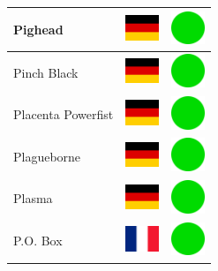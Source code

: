 \documentclass[12pt, a4paper, twoside]{report}
\begin{document}
\begin{center}
\begin{longtable}{|p{5cm}|p{2cm}|p{2cm}|}
 Pighead                                                    & \includegraphics[width=1cm]{4x3/de} &   \includegraphics[width=1cm]{likes/y} \\ \hline
 Pinch Black                                                & \includegraphics[width=1cm]{4x3/de} &   \includegraphics[width=1cm]{likes/y} \\ \hline
 Placenta Powerfist                                         & \includegraphics[width=1cm]{4x3/de} &   \includegraphics[width=1cm]{likes/y} \\ \hline
 Plagueborne                                                & \includegraphics[width=1cm]{4x3/de} &   \includegraphics[width=1cm]{likes/y} \\ \hline
 Plasma                                                     & \includegraphics[width=1cm]{4x3/de} &   \includegraphics[width=1cm]{likes/y} \\ \hline
 P.O. Box                                                   & \includegraphics[width=1cm]{4x3/fr} &   \includegraphics[width=1cm]{likes/y} \\ \hline

\end{longtable}
\end{center}
\end{document}
